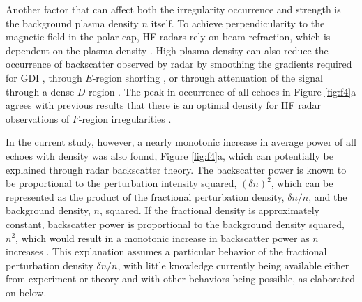 Another factor that can affect both the irregularity occurrence and strength is the background plasma density \(n\) itself. To achieve perpendicularity to the magnetic field in the polar cap, HF radars rely on beam refraction, which is dependent on the plasma density \citep{Bristow2011,Koustov2014,Lamarche2015}.  High plasma density can also reduce the occurrence of backscatter observed by radar by smoothing the gradients required for GDI \citep{Ruohoniemi1997,Koustov2004}, through \(E\)-region shorting \citep{Dan02,Kan12,Lam15}, or through attenuation of the signal through a dense \(D\) region \citep{Danskin2002}.  The peak in occurrence of all echoes in Figure \ref{fig:f4}a agrees with previous results that there is an optimal density for HF radar observations of \(F\)-region irregularities \citep{Danskin2002,Makarevich2014b,Koustov2014,Lamarche2015}.

In the current study, however, a nearly monotonic increase in average power of all echoes with density was also found, Figure \ref{fig:f4}a, which can potentially be explained through radar backscatter theory. The backscatter power is known to be proportional to the perturbation intensity squared, \((\delta n)^2\), which can be represented as the product of the fractional perturbation density, \(\delta n/n\), and the background density, \(n\), squared.  If the fractional density is approximately constant, backscatter power is proportional to the background density squared, \(n^2\), which would result in a monotonic increase in backscatter power as \(n\) increases \citep{Kustov1988,Haldoupis1990,Makarevich2014b}. This explanation assumes a particular behavior of the fractional perturbation density \(\delta n/n\), with little knowledge currently being available either from experiment or theory and with other behaviors being possible, as elaborated on below.

